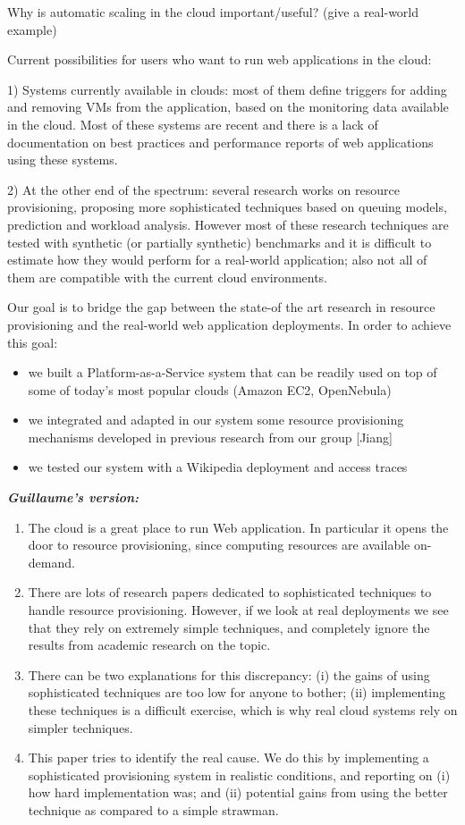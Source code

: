 Why is automatic scaling in the cloud important/useful? (give a real-world example)

Current possibilities for users who want to run web applications in the
cloud: 

1) Systems currently available in clouds: most of them define triggers for 
adding and removing VMs from the application, based on the monitoring 
data available in the cloud. Most of these systems are recent and there 
is a lack of documentation on best practices
and performance reports of web applications using these systems. 

2) At the other end of the spectrum: several research works on resource 
provisioning, proposing more sophisticated techniques based on
queuing models, prediction and workload analysis. However most of these
research techniques are tested with synthetic (or partially synthetic)
benchmarks and it is difficult to estimate how they would perform
for a real-world application; also not all of them are compatible
with the current cloud environments.

Our goal is to bridge the gap between the state-of the art research in
resource provisioning and the real-world web application deployments.
In order to achieve this goal:

\begin{itemize}
\item we built a Platform-as-a-Service system that can be readily used
on top of some of today's most popular clouds (Amazon EC2, OpenNebula)
\item we integrated and adapted in our system some resource  provisioning 
mechanisms developed in previous research from our group [Jiang]
\item we tested our system with a Wikipedia deployment and access
traces  
\end{itemize}   

{\em \textbf{Guillaume's version:}
  \begin{enumerate}
  \item The cloud is a great place to run Web application. In
    particular it opens the door to resource provisioning, since
    computing resources are available on-demand.
  \item There are lots of research papers dedicated to sophisticated
    techniques to handle resource provisioning. However, if we look at
    real deployments we see that they rely on extremely simple
    techniques, and completely ignore the results from academic
    research on the topic.
  \item There can be two explanations for this discrepancy: (i) the
    gains of using sophisticated techniques are too low for anyone to
    bother; (ii) implementing these techniques is a difficult
    exercise, which is why real cloud systems rely on simpler
    techniques.
  \item This paper tries to identify the real cause. We do this by
    implementing a sophisticated provisioning system in realistic
    conditions, and reporting on (i) how hard implementation was; and
    (ii) potential gains from using the better technique as compared
    to a simple strawman.
  \end{enumerate}
}
